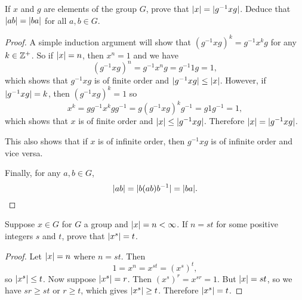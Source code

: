  If $x$ and $g$ are elements of the group $G$, prove that
$\lvert{x}\rvert = \lvert{g^{-1}xg}\rvert$. Deduce that $\lvert{ab}\rvert = \lvert{ba}\rvert$ for all
$a,b\in G$.
\begin{proof}
  A simple induction argument will show that
  $(g^{-1}xg)^k = g^{-1}x^kg$ for any $k\in\mathbb{Z}^+$. So if $\lvert{x}\rvert = n$,
  then $x^n = 1$ and we have
  \begin{equation*}
    (g^{-1}xg)^n = g^{-1}x^ng = g^{-1}1g = 1,
  \end{equation*}
  which shows that $g^{-1}xg$ is of finite order and
  $\lvert{g^{-1}xg}\rvert \leq \lvert{x}\rvert$. However, if $\lvert{g^{-1}xg}\rvert = k$,
  then $(g^{-1}xg)^k = 1$ so
  \begin{equation*}
    x^k = gg^{-1}x^kgg^{-1} = g(g^{-1}xg)^kg^{-1} = g1g^{-1} = 1,
  \end{equation*}
  which shows that $x$ is of finite order and
  $\lvert{x}\rvert \leq \lvert{g^{-1}xg}\rvert$. Therefore $\lvert{x}\rvert = \lvert{g^{-1}xg}\rvert$.

  This also shows that if $x$ is of infinite order, then $g^{-1}xg$ is
  of infinite order and vice versa.

  Finally, for any $a,b\in G$,
  \begin{equation*}
    \lvert{ab}\rvert = \lvert{b(ab)b^{-1}}\rvert = \lvert{ba}\rvert. \qedhere
  \end{equation*}
\end{proof}

 Suppose $x\in G$ for $G$ a group and
$\lvert{x}\rvert = n < \infty$. If $n = st$ for some positive integers $s$ and
$t$, prove that $\lvert{x^s}\rvert = t$.
\begin{proof}
  Let $\lvert{x}\rvert = n$ where $n = st$. Then
  \begin{equation*}
    1 = x^n = x^{st} = (x^s)^t,
  \end{equation*}
  so $\lvert{x^s}\rvert\leq t$. Now suppose $\lvert{x^s}\rvert = r$. Then
  $(x^s)^r = x^{sr} = 1$. But $\lvert{x}\rvert = st$, so we have $sr\geq st$
  or $r\geq t$, which gives $\lvert{x^s}\rvert\geq t$. Therefore
  $\lvert{x^s}\rvert = t$.
\end{proof}


